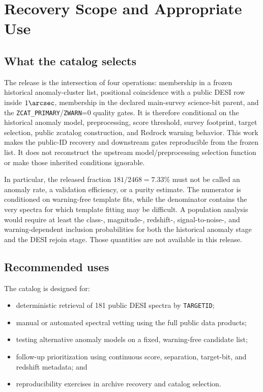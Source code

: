 \documentclass[twocolumn]{aastex701}
\begin{document}
\section{Recovery Scope and Appropriate Use}\label{sec:selection}

\subsection{What the catalog selects}\label{sec:what-selects}

The release is the intersection of four operations: membership in a frozen historical
anomaly-cluster list, positional coincidence with a public DESI row inside $1\arcsec$, membership
in the declared main-survey science-bit parent, and the
\texttt{ZCAT\_PRIMARY}/\texttt{ZWARN}=0 quality gates.  It is therefore conditional on the
historical anomaly model, preprocessing, score threshold, survey footprint, target selection,
public zcatalog construction, and Redrock warning behavior.  This work makes the public-ID
recovery and downstream gates reproducible from the frozen list.  It does not reconstruct the
upstream model/preprocessing selection function or make those inherited conditions ignorable.

In particular, the released fraction $181/2468=7.33\%$ must not be called an anomaly rate, a
validation efficiency, or a purity estimate.  The numerator is conditioned on warning-free
template fits, while the denominator contains the very spectra for which template fitting may be
difficult.  A population analysis would require at least the class-, magnitude-, redshift-,
signal-to-noise-, and warning-dependent inclusion probabilities for both the historical anomaly
stage and the DESI rejoin stage.  Those quantities are not available in this release.

\subsection{Recommended uses}\label{sec:uses}

The catalog is designed for:
\begin{itemize}
\item deterministic retrieval of 181 public DESI spectra by \texttt{TARGETID};
\item manual or automated spectral vetting using the full public data products;
\item testing alternative anomaly models on a fixed, warning-free candidate list;
\item follow-up prioritization using continuous score, separation, target-bit, and redshift metadata; and
\item reproducibility exercises in archive recovery and catalog selection.
\end{itemize}
\end{document}

